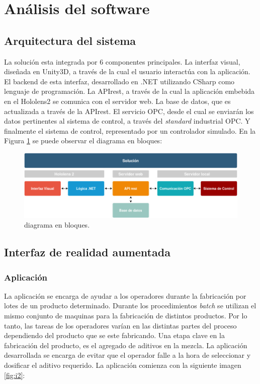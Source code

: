 \section{Análisis del software}

\subsection{Arquitectura del sistema}
La solución esta integrada por 6 componentes principales. La interfaz visual, diseñada en Unity3D, a través de la cual el usuario interactúa con la aplicación. El backend de esta interfaz, desarrollado en .NET utilizando CSharp como lenguaje de programación. La APIrest, a través de la cual la aplicación embebida en el Hololens2 se comunica con el servidor web. La base de datos, que es actualizada a través de la APIrest. El servicio OPC, desde el cual se enviarán los datos pertinentes al sistema de control, a través del \textit{standard} industrial OPC. Y finalmente el sistema de control, representado por un controlador simulado. En la Figura \ref{fig:Diag_bloques} se puede observar el diagrama en bloques:

\begin{figure}[htpb]
	\centering
	\includegraphics[scale=.5]{./Figures/Diag_bloques.jpg}
	\caption{diagrama en bloques\protect\footnotemark.}
	\label{fig:Diag_bloques}
\end{figure}

\subsection{Interfaz de realidad aumentada}
\subsubsection{Aplicación}

La aplicación se encarga de ayudar a los operadores durante la fabricación por lotes de un producto determinado. Durante los procedimientos \textit{batch} se utilizan el mismo conjunto de maquinas para la fabricación de distintos productos. Por lo tanto, las tareas de los operadores varían en las distintas partes del proceso dependiendo del producto que se este fabricando. Una etapa clave en la fabricación del producto, es el agregado de aditivos en la mezcla. La aplicación desarrollada se encarga de evitar que el operador falle a la hora de seleccionar y dosificar el aditivo requerido. La aplicación comienza con la siguiente imagen \ref{fig:i2}:

